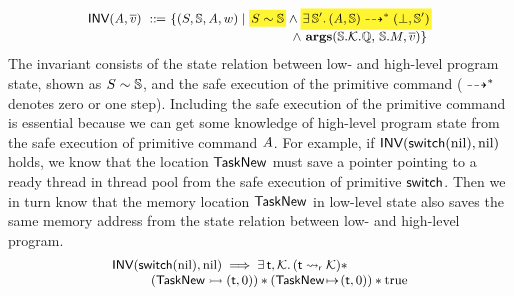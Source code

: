 \[
    \small
    \begin{array}{l}
        \INV{(\primcom, \args{\val})} \ \define \ 
        \{
            (\state, \hpstate, \primcom, \word) \sepline
            \colorbox{yellow!80}{\!$\stateRel{\state}{\hpstate}$\!}
            \land 
            \colorbox{yellow!80}
            {\!\!\!
                $\exists \, \hpstate'. \,
                \primMultiTrans
                    {(\primcom, \hpstate)}
                    {*}{(\primdone, \hpstate')}$ 
            \!\!\!} \\
            \hspace*{15.8em} 
            \land \
            \arguments(\hpstate.\hthrdlocalst.\hRstate, \,  
            \hpstate.\Mem, \args{\val})
        \}
    \end{array}
\]
The invariant consists of the state relation between low- and 
high-level program state,  
shown as ${S} \sim {\mathbb{S}}$, 
and the safe execution of the primitive command
(${} \dashrightarrow^{*} {}$ denotes zero or one step). 
Including the safe execution of 
the primitive command is essential 
because we can get some knowledge of high-level program 
state from the safe execution of 
primitive command $\textit{A}$. 
For example, if $\textsf{INV}{(\mathsf{switch}(\text{nil}), \text{nil})}$
holds, we know that the location $\mathsf{TaskNew}$ 
must save a pointer pointing to a ready thread
in thread pool from the safe execution of primitive $\mathsf{switch}$. 
Then we in turn know that the memory location $\mathsf{TaskNew}$ 
in low-level state also saves the same memory address  
from the state relation 
between low- and high-level program. 
\[
    \small
    \begin{array}{l}
        \textsf{INV}{(\mathsf{switch}(\text{nil}), \text{nil})} 
        \implies
        \exists \, \textsf{t}, \mathcal{K}. \, 
        ({\textsf{t}} \leadsto_{\textsf{r}} {\mathcal{K}}) * \\
        \qquad\quad
        ({\mathsf{TaskNew}} \rightarrowtail {(\textsf{t}, 0)}) 
        * 
        ({\mathsf{TaskNew}} \!\mapsto\! {(\textsf{t}, 0)})
        * \text{true}
    \end{array}
\]
